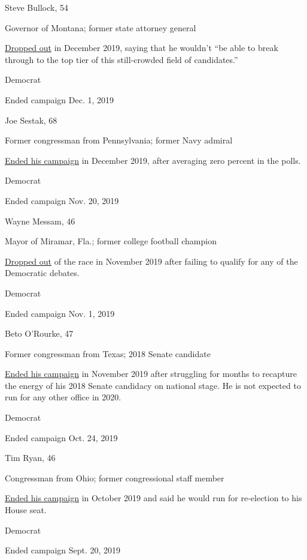 Steve Bullock, 54

Governor of Montana; former state attorney general

\href{https://www.nytimes3xbfgragh.onion/2019/12/02/us/politics/steve-bullock-2020-drops-out.html}{Dropped
out} in December 2019, saying that he wouldn't ``be able to break
through to the top tier of this still-crowded field of candidates.''

Democrat

Ended campaign Dec. 1, 2019

Joe Sestak, 68

Former congressman from Pennsylvania; former Navy admiral

\href{https://www.nytimes3xbfgragh.onion/2019/12/01/us/politics/joe-sestak-ends-presidential-campaign.html}{Ended
his campaign} in December 2019, after averaging zero percent in the
polls.

Democrat

Ended campaign Nov. 20, 2019

Wayne Messam, 46

Mayor of Miramar, Fla.; former college football champion

\href{https://www.nytimes3xbfgragh.onion/2019/11/20/us/politics/wayne-messam-2020.html}{Dropped
out} of the race in November 2019 after failing to qualify for any of
the Democratic debates.

Democrat

Ended campaign Nov. 1, 2019

Beto O'Rourke, 47

Former congressman from Texas; 2018 Senate candidate

\href{https://www.nytimes3xbfgragh.onion/2019/11/01/us/politics/beto-orourke-drops-out.html}{Ended
his campaign} in November 2019 after struggling for months to recapture
the energy of his 2018 Senate candidacy on national stage. He is not
expected to run for any other office in 2020.

Democrat

Ended campaign Oct. 24, 2019

Tim Ryan, 46

Congressman from Ohio; former congressional staff member

\href{https://www.nytimes3xbfgragh.onion/2019/10/24/us/politics/tim-ryan-drops-out.html}{Ended
his campaign} in October 2019 and said he would run for re-election to
his House seat.

Democrat

Ended campaign Sept. 20, 2019

